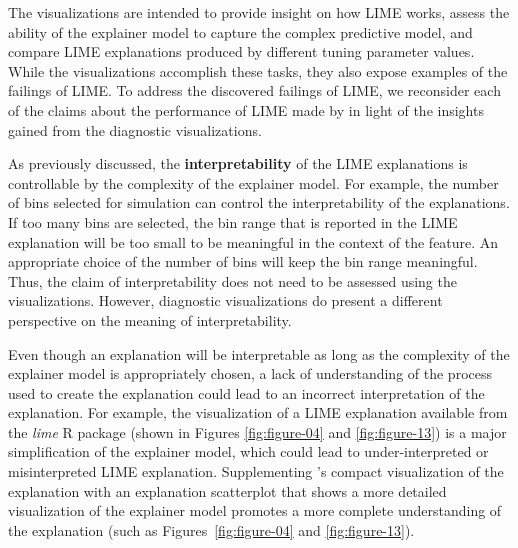 \documentclass[AMS,STIX2COL]{WileyNJD-v2}\usepackage[]{graphicx}\usepackage[]{color}
\begin{document}
The visualizations are intended to provide insight on how LIME works, assess the ability of the explainer model to capture the complex predictive model, and compare LIME explanations produced by different tuning parameter values. While the visualizations accomplish these tasks, they also expose examples of the failings of LIME. To address the discovered failings of LIME, we reconsider each of the claims about the performance of LIME made by \citet{ribeiro:2016} in light of the insights gained from the diagnostic visualizations.

As previously discussed, the \textbf{interpretability} of the LIME explanations is controllable  by the complexity of the explainer model. For example, the number of bins selected for simulation can control the interpretability of the explanations. If too many bins are selected, the bin range that is reported in the LIME explanation will be too small to be meaningful in the context of the feature. An appropriate choice of the number of bins will keep the bin range meaningful. Thus, the claim of interpretability does not need to be assessed using the visualizations. However, diagnostic visualizations do present a different perspective on the meaning of interpretability.

Even though an explanation will be interpretable as long as the complexity of the explainer model is appropriately chosen, a lack of understanding of the process used to create the explanation could lead to an incorrect interpretation of the explanation. For example, the visualization of a LIME explanation available from the \emph{lime} R package \citep{pedersen:2020} (shown in Figures \ref{fig:figure-04} and \ref{fig:figure-13}) is a major simplification of the explainer model, which could lead to under-interpreted or misinterpreted LIME explanation. Supplementing \citet{pedersen:2020}'s compact visualization of the explanation with an explanation scatterplot that shows a more detailed visualization of the explainer model promotes a more complete understanding of the explanation (such as Figures~\ref{fig:figure-04} and \ref{fig:figure-13}).
\end{document}
